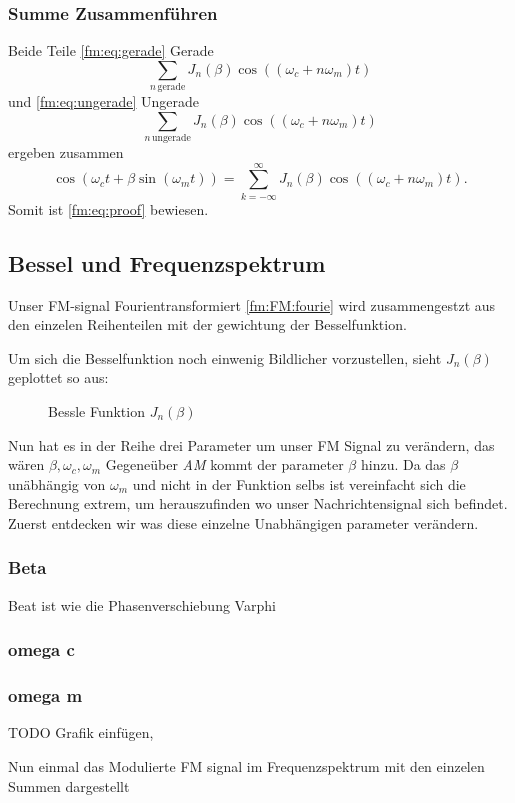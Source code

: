 \subsubsection{Summe Zusammenführen}
Beide Teile \eqref{fm:eq:gerade} Gerade 
\[
    \sum_{n\, \text{gerade}} J_{n}(\beta) \cos((\omega_c + n\omega_m) t)
\]
und \eqref{fm:eq:ungerade} Ungerade 
\[
    \sum_{n\, \text{ungerade}} J_{n}(\beta) \cos((\omega_c + n\omega_m) t)
\]
ergeben zusammen
\[
    \cos(\omega_ct+\beta\sin(\omega_mt))
    =
    \sum_{k= -\infty}^\infty J_{n}(\beta) \cos((\omega_c+ n\omega_m)t).
\]
Somit ist \eqref{fm:eq:proof} bewiesen.
\newpage
\subsection{Bessel und Frequenzspektrum}
Unser FM-signal Fourientransformiert \eqref{fm:FM:fourie} wird zusammengestzt aus den einzelen Reihenteilen mit der gewichtung der Besselfunktion.

Um sich die Besselfunktion noch einwenig Bildlicher vorzustellen, sieht \(J_{n}(\beta)\) geplottet so aus:
\begin{figure}
	\centering
	
	\caption{Bessle Funktion \(J_{n}(\beta)\)}
	\label{fig:bessel}
\end{figure}

Nun hat es in der Reihe drei Parameter um unser FM Signal zu verändern, das wären \( \beta, \omega_c, \omega_m\)
Gegeneüber \textit{AM} kommt der parameter \( \beta\) hinzu. 
Da das \(\beta\) unäbhängig von \(\omega_m\) und nicht in der Funktion selbs ist vereinfacht sich die Berechnung extrem, um herauszufinden wo unser Nachrichtensignal sich befindet.
Zuerst entdecken wir was diese einzelne Unabhängigen parameter verändern.
\subsubsection{Beta}
Beat ist wie die Phasenverschiebung Varphi
\newpage
\subsubsection{omega c}
\newpage
\subsubsection{omega m}
\newpage
TODO Grafik einfügen,

Nun einmal das Modulierte FM signal im Frequenzspektrum mit den einzelen Summen dargestellt

